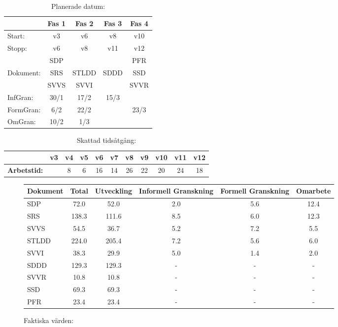\documentclass[paper=a4, fontsize=11pt,twoside]{article}
\begin{document}
\begin{table}[H]
\centering
\caption{Planerade datum:}
\begin{tabular}{| l | c | c | c | c |} %
\hline
 & Fas 1 & Fas 2 & Fas 3 & Fas 4\\
\hline
Start: & v3 & v6 & v8 & v10 \\
\hline
Stopp: & v6 & v8 & v11 & v12 \\
\hline
 				& SDP & & & PFR \\
Dokument: & SRS & STLDD & SDDD & SSD \\
 				& SVVS & SVVI & & SVVR \\
\hline
InfGran: & 30/1 & 17/2 & 15/3 & 	 \\
\hline
FormGran: & 6/2 & 22/2 &	 & 23/3 \\
\hline
OmGran: & 10/2 & 1/3 &		 & \\
\hline
\end{tabular}
\end{table}

\begin{table}[H]
\centering
\caption{Skattad tidsåtgång:}
\vspace{0.2cm}
\begin{tabular}{| l | c | c | c | c | c | c | c | c | c | c |}
\hline
 & \textbf{v3} & \textbf{v4} & \textbf{v5} & \textbf{v6} & \textbf{v7} & \textbf{v8} & \textbf{v9} & \textbf{v10} & \textbf{v11} & \textbf{v12}\\
\hline
\textbf{Arbetstid:}  &  & 8 & 6 & 16 & 14 & 26 & 22 & 20 & 24 & 18 \\
\hline
\end{tabular}
\end{table}

\begin{figure}[h!]
\centering
\caption{Faktiska värden:}
\begin{tabular}{|l|c|c|c|c|c|}
\hline
\textbf{Dokument} & {\fontsize{8pt}{0.2cm}\selectfont Total} &
{\fontsize{8pt}{0.2cm}\selectfont Utveckling} &
{\fontsize{8pt}{0.2cm}\selectfont Informell Granskning} &
{\fontsize{8pt}{0.2cm}\selectfont Formell Granskning} &
{\fontsize{8pt}{0.2cm}\selectfont Omarbete}\\
\hline
SDP & 72.0 & 52.0 & 2.0 & 5.6 & 12.4\\
\hline
SRS & 138.3 & 111.6 & 8.5 & 6.0 & 12.3\\
\hline
SVVS & 54.5 & 36.7 & 5.2 & 7.2 & 5.5\\
\hline
STLDD & 224.0 & 205.4 & 7.2 & 5.6 & 6.0\\
\hline
SVVI & 38.3 & 29.9 & 5.0 & 1.4 & 2.0\\
\hline
SDDD & 129.3 & 129.3 & - & - & -\\
\hline
SVVR & 10.8 & 10.8 & - & - & -\\
\hline
SSD & 69.3 & 69.3 & - & - & -\\
\hline
PFR & 23.4 & 23.4 & - & - & -\\
\hline
\end{tabular}
\end{figure}
\end{document}
